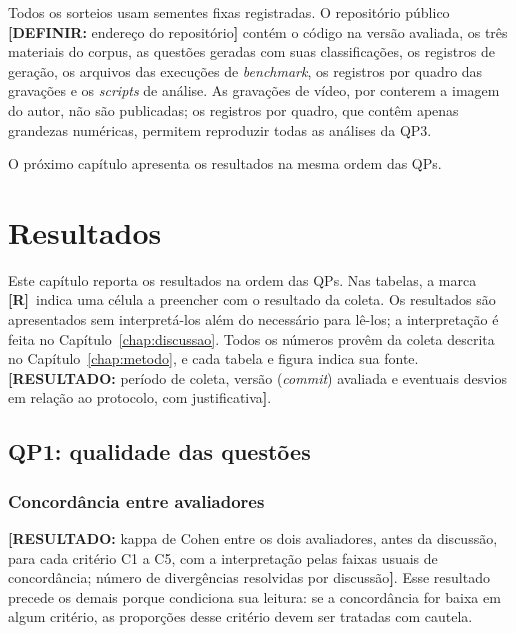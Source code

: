 \documentclass[portuguese,oneside]{tcc}
\newcommand{\estr}[1]{\emph{#1}}
\newcommand{\resultado}[1]{\textcolor{red!70!black}{\textbf{[RESULTADO:} #1\textbf{]}}}
\newcommand{\definir}[1]{\textcolor{orange!75!black}{\textbf{[DEFINIR:} #1\textbf{]}}}
\newcommand{\rr}{\textcolor{red!70!black}{\textbf{[R]}}}
\begin{document}
Todos os sorteios usam sementes fixas registradas. O repositório público \definir{endereço do repositório} contém o código na versão avaliada, os três materiais do corpus, as questões geradas com suas classificações, os registros de geração, os arquivos das execuções de \estr{benchmark}, os registros por quadro das gravações e os \estr{scripts} de análise. As gravações de vídeo, por conterem a imagem do autor, não são publicadas; os registros por quadro, que contêm apenas grandezas numéricas, permitem reproduzir todas as análises da QP3.

O próximo capítulo apresenta os resultados na mesma ordem das QPs.

\chapter{\label{chap:resultados}Resultados}

\newcommand{\figurapendente}[1]{%
  \fbox{\begin{minipage}[c][4.2cm][c]{0.9\textwidth}\centering\small
  \textcolor{red!70!black}{\textbf{[FIGURA PENDENTE]}}\\[2pt] #1\end{minipage}}}

Este capítulo reporta os resultados na ordem das QPs. Nas tabelas, a marca \rr\ indica uma célula a preencher com o resultado da coleta. Os resultados são apresentados sem interpretá-los além do necessário para lê-los; a interpretação é feita no Capítulo~\ref{chap:discussao}. Todos os números provêm da coleta descrita no Capítulo~\ref{chap:metodo}, e cada tabela e figura indica sua fonte. \resultado{período de coleta, versão (\estr{commit}) avaliada e eventuais desvios em relação ao protocolo, com justificativa}.

\section{QP1: qualidade das questões}

\subsection{Concordância entre avaliadores}

\resultado{kappa de Cohen entre os dois avaliadores, antes da discussão, para cada critério C1 a C5, com a interpretação pelas faixas usuais de concordância; número de divergências resolvidas por discussão}. Esse resultado precede os demais porque condiciona sua leitura: se a concordância for baixa em algum critério, as proporções desse critério devem ser tratadas com cautela.
\end{document}
